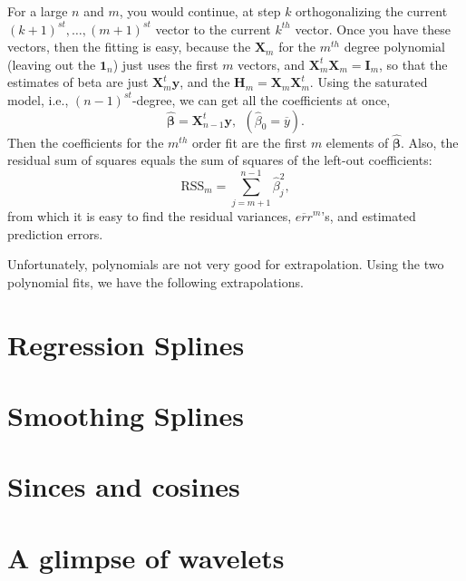 \documentclass[
]{book}
\begin{document}
For a large \(n\) and \(m\), you would continue, at step \(k\) orthogonalizing the current \((k+1)^{st},\ldots,(m+1)^{st}\)
vector to the current \(k^{th}\) vector. Once you have these vectors, then the fitting is easy, because the \(\mathbf{X}_m\) for
the \(m^{th}\) degree polynomial (leaving out the \(\mathbf{1}_n\)) just uses the first \(m\) vectors, and
\(\mathbf{X}_m^t\mathbf{X}_m=\mathbf{I}_m\), so that the estimates of beta are just \(\mathbf{X}^t_m\mathbf{y}\), and the \(\mathbf{H}_m=\mathbf{X}_m\mathbf{X}_m^t\). Using the
saturated model, i.e., \((n-1)^{st}\)-degree, we can get all the coefficients at once,
\begin{equation}
\widehat{\boldsymbol{\beta}} = \mathbf{X}_{n-1}^t\mathbf{y},~~(\widehat\beta_0=\overline y).
\label{eq:poly15}
\end{equation}
Then the coefficients for the \(m^{th}\) order fit are the first \(m\) elements of \(\widehat{\boldsymbol{\beta}}\). Also, the
residual sum of squares equals the sum of squares of the left-out coefficients:
\begin{equation}
\text{RSS}_m = \sum_{j=m+1}^{n-1} \widehat\beta_j^2,
\label{eq:poly16}
\end{equation}
from which it is easy to find the residual variances, \(\overline {err}^m\)'s, and estimated prediction errors.

Unfortunately, polynomials are not very good for extrapolation. Using the two polynomial fits, we have the
following extrapolations.

\hypertarget{regression-splines}{%
\section{Regression Splines}\label{regression-splines}}

\hypertarget{smoothing-splines}{%
\section{Smoothing Splines}\label{smoothing-splines}}

\hypertarget{sinces-and-cosines}{%
\section{Sinces and cosines}\label{sinces-and-cosines}}

\hypertarget{a-glimpse-of-wavelets}{%
\section{A glimpse of wavelets}\label{a-glimpse-of-wavelets}}
\end{document}
